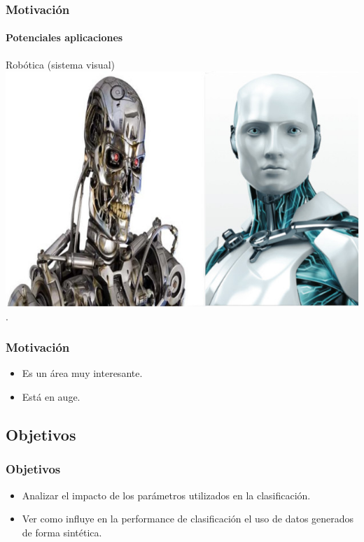 	\begin{frame}
		\frametitle{Motivación}
		\framesubtitle{Potenciales aplicaciones}
		\begin{center}
			 Robótica (sistema visual)
			 \includegraphics[height=0.65\paperheight]{imgs/robot_ocr.jpg}.		
		\end{center}
	\end{frame}
	\begin{frame}
		\frametitle{Motivación}
		\begin{itemize}
			\item<1-> Es un área muy interesante.
			\item<2-> Está en auge.
		\end{itemize}
	\end{frame}
	\subsection{Objetivos}
	\begin{frame}
		\frametitle{Objetivos}
		\begin{itemize}
			\item Analizar el impacto de los parámetros utilizados en la clasificación.
			\item Ver como influye en la performance de clasificación el uso de datos generados de forma sintética.
		\end{itemize}
	\end{frame}